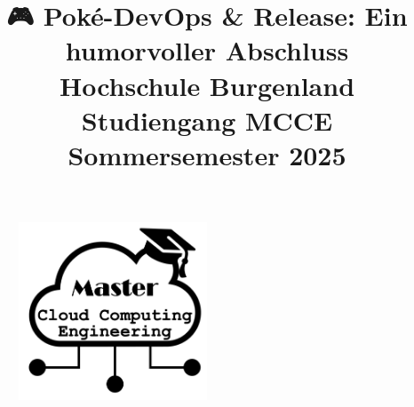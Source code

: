 \begin{figure}
    \centering
    \includegraphics[width=0.5\textwidth]{fig/Fig1.png}
    \label{fig:title-image}
\end{figure}


\title{
    🎮 Poké-DevOps & Release: Ein humorvoller Abschluss \\
    \vspace{0.5cm}
    \large{Hochschule Burgenland} \\
    \large{Studiengang MCCE} \\
    \large{Sommersemester 2025}
}
